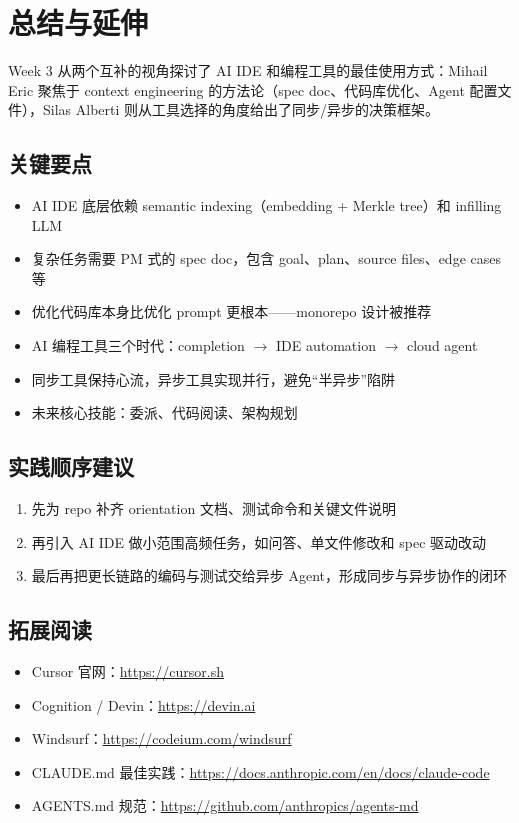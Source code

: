 \section{总结与延伸}

Week 3 从两个互补的视角探讨了 AI IDE 和编程工具的最佳使用方式：Mihail Eric 聚焦于 context engineering 的方法论（spec doc、代码库优化、Agent 配置文件），Silas Alberti 则从工具选择的角度给出了同步/异步的决策框架。

\subsection{关键要点}

\begin{itemize}
    \item AI IDE 底层依赖 semantic indexing（embedding + Merkle tree）和 infilling LLM
    \item 复杂任务需要 PM 式的 spec doc，包含 goal、plan、source files、edge cases 等
    \item 优化代码库本身比优化 prompt 更根本——monorepo 设计被推荐
    \item AI 编程工具三个时代：completion $\rightarrow$ IDE automation $\rightarrow$ cloud agent
    \item 同步工具保持心流，异步工具实现并行，避免``半异步''陷阱
    \item 未来核心技能：委派、代码阅读、架构规划
\end{itemize}

\subsection{实践顺序建议}

\begin{enumerate}
    \item 先为 repo 补齐 orientation 文档、测试命令和关键文件说明
    \item 再引入 AI IDE 做小范围高频任务，如问答、单文件修改和 spec 驱动改动
    \item 最后再把更长链路的编码与测试交给异步 Agent，形成同步与异步协作的闭环
\end{enumerate}

\subsection{拓展阅读}

\begin{itemize}
    \item Cursor 官网：\url{https://cursor.sh}
    \item Cognition / Devin：\url{https://devin.ai}
    \item Windsurf：\url{https://codeium.com/windsurf}
    \item CLAUDE.md 最佳实践：\url{https://docs.anthropic.com/en/docs/claude-code}
    \item AGENTS.md 规范：\url{https://github.com/anthropics/agents-md}
\end{itemize}



